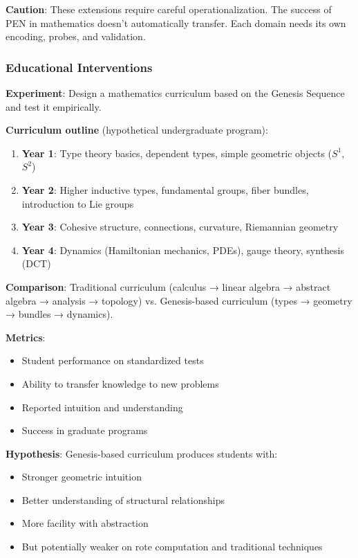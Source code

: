 \documentclass[11pt]{article}
\theoremstyle{definition}
\begin{document}
\textbf{Caution}: These extensions require careful operationalization. The success of PEN in mathematics doesn't automatically transfer. Each domain needs its own encoding, probes, and validation.

\subsubsection{Educational Interventions}

\textbf{Experiment}: Design a mathematics curriculum based on the Genesis Sequence and test it empirically.

\textbf{Curriculum outline} (hypothetical undergraduate program):
\begin{enumerate}
\item \textbf{Year 1}: Type theory basics, dependent types, simple geometric objects ($S^1$, $S^2$)
\item \textbf{Year 2}: Higher inductive types, fundamental groups, fiber bundles, introduction to Lie groups
\item \textbf{Year 3}: Cohesive structure, connections, curvature, Riemannian geometry
\item \textbf{Year 4}: Dynamics (Hamiltonian mechanics, PDEs), gauge theory, synthesis (DCT)
\end{enumerate}

\textbf{Comparison}: Traditional curriculum (calculus → linear algebra → abstract algebra → analysis → topology) vs. Genesis-based curriculum (types → geometry → bundles → dynamics).

\textbf{Metrics}:
\begin{itemize}
\item Student performance on standardized tests
\item Ability to transfer knowledge to new problems
\item Reported intuition and understanding
\item Success in graduate programs
\end{itemize}

\textbf{Hypothesis}: Genesis-based curriculum produces students with:
\begin{itemize}
\item Stronger geometric intuition
\item Better understanding of structural relationships
\item More facility with abstraction
\item But potentially weaker on rote computation and traditional techniques
\end{itemize}
\end{document}
